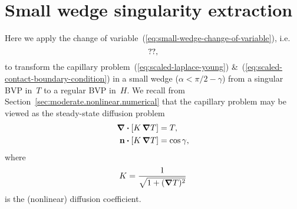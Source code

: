 \chapter{Small wedge singularity extraction}
\label{ch:extraction}

Here we apply the change of variable~(\ref{eq:small-wedge-change-of-variable}),
i.e.
\begin{equation}
  \usecontent{eq:small-wedge-change-of-variable},
  \label{eq:small-wedge-change-of-variable-appendix}
\end{equation}
to transform the capillary problem~(\ref{eq:scaled-laplace-young})
\&~(\ref{eq:scaled-contact-boundary-condition})
in a small wedge ($\alpha < \pi/2 - \gamma$)
from a singular BVP in~$T$
to a regular BVP in~$H$.
We recall from Section~\ref{sec:moderate.nonlinear.numerical}
that the capillary problem may be viewed
as the steady-state diffusion problem
\begin{align}
  \mathop{}\!\boldsymbol{\mathbf{\nabla}} \boldsymbol{\cdot} [K \mathop{}\!\boldsymbol{\mathbf{\nabla}} T] &= T,
    \label{eq:laplace-young-diffusion-appendix}
    \\
  \mathop{}\!\boldsymbol{\mathbf{n}} \boldsymbol{\cdot} [K \mathop{}\!\boldsymbol{\mathbf{\nabla}} T] &= \cos\gamma,
  \label{eq:contact-boundary-condition-diffusion-appendix}
\end{align}
where
\begin{equation}
  K = \frac{1}{\sqrt{1 + (\mathop{}\!\boldsymbol{\mathbf{\nabla}} T)^2}}
  \label{eq:laplace-young-diffusion-coefficient-appendix}
\end{equation}
is the (nonlinear) diffusion coefficient.

